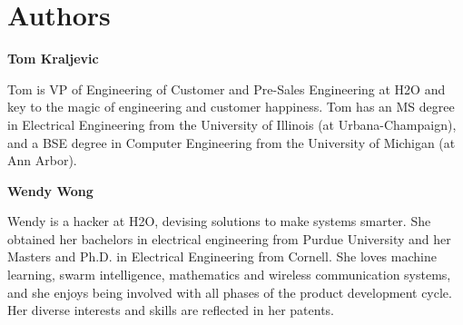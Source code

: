 \section{Authors}

\textbf{Tom Kraljevic}

Tom is VP of Engineering of Customer and Pre-Sales Engineering at H2O and key to the magic of engineering and customer happiness. Tom has an MS degree in Electrical Engineering from the University of Illinois (at Urbana-Champaign), and a BSE degree in Computer Engineering from the University of Michigan (at Ann Arbor).

\textbf{Wendy Wong}

Wendy is a hacker at H2O, devising solutions to make systems smarter. She obtained her bachelors in electrical engineering from Purdue University and her Masters and Ph.D. in Electrical Engineering from Cornell. She loves machine learning, swarm intelligence, mathematics and wireless communication systems, and she enjoys being involved with all phases of the product development cycle. Her diverse interests and skills are reflected in her patents.


